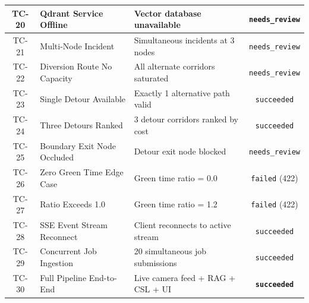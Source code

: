 \begin{longtable}{|c|p{4.2cm}|p{4.8cm}|c|}
\hline
TC-20 & Qdrant Service Offline & Vector database unavailable & \texttt{needs\_review} \\
\hline
TC-21 & Multi-Node Incident & Simultaneous incidents at 3 nodes & \texttt{needs\_review} \\
\hline
TC-22 & Diversion Route No Capacity & All alternate corridors saturated & \texttt{needs\_review} \\
\hline
TC-23 & Single Detour Available & Exactly 1 alternative path valid & \texttt{succeeded} \\
\hline
TC-24 & Three Detours Ranked & 3 detour corridors ranked by cost & \texttt{succeeded} \\
\hline
TC-25 & Boundary Exit Node Occluded & Detour exit node blocked & \texttt{needs\_review} \\
\hline
TC-26 & Zero Green Time Edge Case & Green time ratio = 0.0 & \texttt{failed} (422) \\
\hline
TC-27 & Ratio Exceeds 1.0 & Green time ratio = 1.2 & \texttt{failed} (422) \\
\hline
TC-28 & SSE Event Stream Reconnect & Client reconnects to active stream & \texttt{succeeded} \\
\hline
TC-29 & Concurrent Job Ingestion & 20 simultaneous job submissions & \texttt{succeeded} \\
\hline
TC-30 & Full Pipeline End-to-End & Live camera feed + RAG + CSL + UI & \textbf{\texttt{succeeded}} \\
\hline
\end{longtable}
